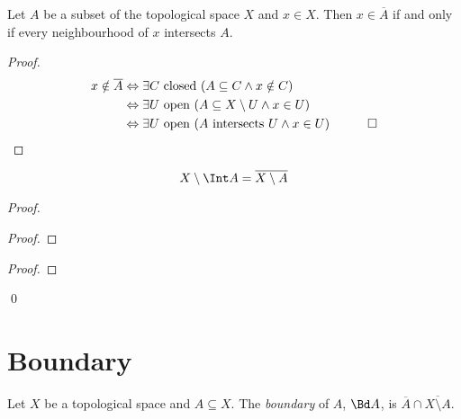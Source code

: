 \begin{thm}
  \label{thm:topology:closure:neighbourhoods}
  Let $A$ be a subset of the topological space $X$ and $x \in X$. Then $x \in
  \overline{A}$ if and only if every neighbourhood of $x$ intersects $A$.
\end{thm}

\begin{proof}
  \pf
  \begin{align*}
    x \notin \overline{A} & \Leftrightarrow \exists C \text{ closed } (A
    \subseteq C \wedge x \notin C) \\
    & \Leftrightarrow \exists U \text{ open } (A \subseteq X \setminus U
    \wedge x
    \in U) \\
    & \Leftrightarrow \exists U \text{ open } (A \text{ intersects } U \wedge
    x
    \in U) & \qed
  \end{align*}
\end{proof}

\begin{lm}
  \label{lm:topology:closure_interior:complementary}
  \[ X \setminus \Int A = \overline{X \setminus A} \]
\end{lm}

\begin{proof}
  \pf
  \begin{proof}
  \end{proof}
  \begin{proof}
  \end{proof}
  \qed
\end{proof}

\section{Boundary}

\begin{df}[Boundary]
  Let $X$ be a topological space and $A \subseteq X$. The \emph{boundary} of
  $A$, $\Bd A$, is $\overline{A} \cap \overline{X \setminus A}$.
\end{df}

